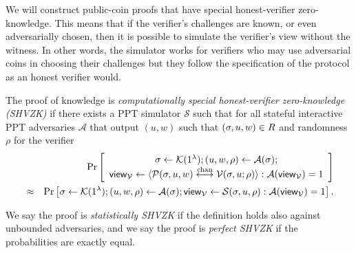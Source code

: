 We will construct public-coin proofs that have special honest-verifier zero-knowledge. This means that if the verifier's challenges are known, or even adversarially chosen, then it is possible to simulate the verifier's view without the witness.  In other words, the simulator works for verifiers who may use adversarial coins in choosing their challenges but they follow the specification of the protocol as an honest verifier would. 
\begin{definition}
The proof of knowledge is \emph{computationally special honest-verifier zero-knowledge (SHVZK)} if there exists a PPT simulator $\mathcal{S}$ such that for all stateful interactive PPT adversaries $\mathcal{A}$ that output $(u,w)$ such that $(\mathsf{\sigma},u,w)\in R$ and randomness $\rho$ for the verifier
\begin{eqnarray*}
&&\Pr \left[ \begin{array}{c}\mathsf{\sigma}\gets \mathcal{K}(1^{\lambda});(u, w, \rho) \leftarrow\mathcal{A}(\mathsf{\sigma}); \\
\mathsf{view}_{\mathcal{V}}\leftarrow \langle \mathcal{P}(\mathsf{\sigma},u,w)\overset{\textnormal{chan}}{\longleftrightarrow} \mathcal{V}(\mathsf{\sigma},u;\rho)\rangle: \mathcal{A}(\mathsf{view}_{\mathcal{V}})=1\end{array} \right]\\
&\approx &\Pr \left[ \mathsf{\sigma}\gets \mathcal{K}(1^{\lambda});(u, w, \rho) \leftarrow\mathcal{A}(\mathsf{\sigma}); \mathsf{view}_{\mathcal{V}}\leftarrow \mathcal{S}(\mathsf{\sigma},u,\rho): \mathcal{A}(\mathsf{view}_{\mathcal{V}})=1\right].
\end{eqnarray*}

We say the proof is \emph{statistically SHVZK} if the definition holds also against unbounded adversaries, and we say the proof is \emph{perfect SHVZK} if the probabilities are exactly equal.
\end{definition}